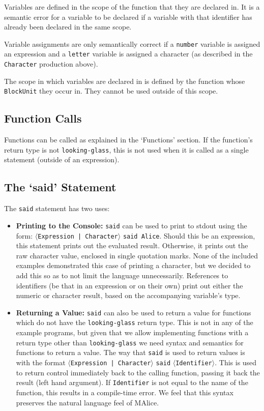 \documentclass[a4wide, 11pt]{article}
\begin{document}
Variables are defined in the scope of the function that they are declared in. It is a semantic error for a variable to be declared if a variable with that identifier has already been declared in the same scope.

Variable assignments are only semantically correct if a \texttt{number} variable is assigned an expression and a \texttt{letter} variable is assigned a character (as described in the \texttt{Character} production above).

The scope in which variables are declared in is defined by the function whose \texttt{BlockUnit} they occur in. They cannot be used outside of this scope.

\subsection{Function Calls}

Functions can be called as explained in the `Functions' section. If the function's return type is not \texttt{looking-glass}, this is not used when it is called as a single statement (outside of an expression).

\subsection{The `said' Statement}

The \texttt{said} statement has two uses:
\begin{itemize}
\item \textbf{Printing to the Console:} \texttt{said} can be used to print to stdout using the form: $\langle$\texttt{Expression | Character}$\rangle$ \texttt{said Alice}. Should this be an expression, this statement prints out the evaluated result. Otherwise, it prints out the raw character value, enclosed in single quotation marks. None of the included examples demonstrated this case of printing a character, but we decided to add this so as to not limit the language unnecessarily. References to identifiers (be that in an expression or on their own) print out either the numeric or character result, based on the accompanying variable's type.
\item \textbf{Returning a Value:} \texttt{said} can also be used to return a value for functions which do not have the \texttt{looking-glass} return type. This is not in any of the example programs, but given that we allow implementing functions with a return type other than \texttt{looking-glass} we need syntax and semantics for functions to return a value. The way that \texttt{said} is used to return values is with the format $\langle$\texttt{Expression | Character}$\rangle$ \texttt{said} $\langle$\texttt{Identifier}$\rangle$. This is used to return control immediately back to the calling function, passing it back the result (left hand argument). If \texttt{Identifier} is not equal to the name of the function, this results in a compile-time error. We feel that this syntax preserves the natural language feel of MAlice.
\end{itemize}
\end{document}
